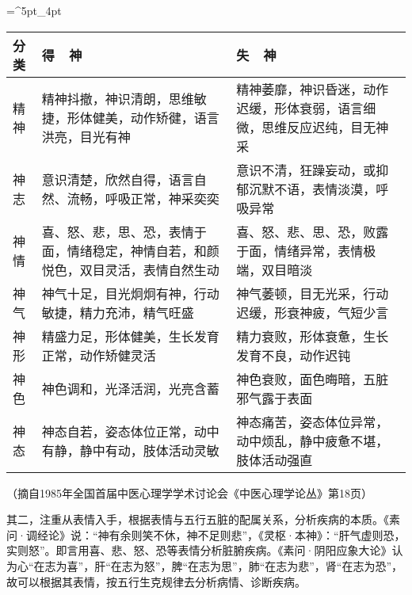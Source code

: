 \documentclass[12pt]{ctexbook}
\begin{document}
\begin{table}[h]%
	\centering
	\begin{threeparttable}
		\tabulinesep=^5pt_4pt
		\begin{tabu}to.87\textwidth{X[-1,c,m]|X[5,m]|X[5,m]}
			\toprule
			\rowfont[c]{}
			分类 & 得\ \ 神                                                                           & 失\ \ 神 \\
			\midrule
			精神 & 精神抖撤，神识清朗，思维敏捷，形体健美，动作矫徤，语言洪亮，目光有神               & 精神萎靡，神识昏迷，动作迟缓，形体衰弱，语言细微，思维反应迟纯，目无神采 \\ \hline
			神志 & 意识清楚，欣然自得，语言自然、流畅，呼吸正常，神采奕奕                             & 意识不清，狂躁妄动，或抑郁沉默不语，表情淡漠，呼吸异常 \\ \hline
			神情 & 喜、怒、悲，思、恐，表情于面，情绪稳定，神情自若，和颜悦色，双目灵活，表情自然生动 & 喜、怒、悲、思、恐，败露于面，情绪异常，表情极端，双目暗淡 \\ \hline
			神气 & 神气十足，目光炯炯有神，行动敏捷，精力充沛，精气旺盛                               & 神气萎顿，目无光采，行动迟缓，形衰神疲，气短少言 \\ \hline
			神形 & 精盛力足，形体健美，生长发育正常，动作矫健灵活                                     & 精力衰败，形体衰惫，生长发育不良，动作迟钝 \\ \hline
			神色 & 神色调和，光泽活润，光亮含蓄                                                       & 神色衰败，面色晦暗，五脏邪气露于表面 \\ \hline
			神态 & 神态自若，姿态体位正常，动中有静，静中有动，肢体活动灵敏                           & 神态痛苦，姿态体位异常，动中烦乱，静中疲惫不堪，肢体活动强直 \\
			\bottomrule
		\end{tabu}
		\begin{tablenotes}
			\footnotesize
			\item[]（摘自1985年全国首届中医心理学学术讨论会《中医心理学论丛》第18页）
		\end{tablenotes}
	\end{threeparttable}
\end{table}

其二，注重从表情入手，根据表情与五行五脏的配属关系，分析疾病的本质。《素问·调经论》说：“神有余则笑不休，神不足则悲”，《灵枢·本神》：“肝气虚则恐，实则怒”。即言用喜、悲、怒、恐等表情分析脏腑疾病。《素问·阴阳应象大论》认为心“在志为喜”，肝“在志为怒”，脾“在志为思”，肺“在志为悲”，肾“在志为恐”，故可以根据其表情，按五行生克规律去分析病情、诊断疾病。
\end{document}
